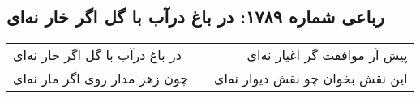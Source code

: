 \begin{center}
\section*{رباعی شماره ۱۷۸۹: در باغ درآب با گل اگر خار نه‌ای}
\label{sec:1789}
\begin{longtable}{l p{0.5cm} r}
در باغ درآب با گل اگر خار نه‌ای
&&
پیش آر موافقت گر اغیار نه‌ای
\\
چون زهر مدار روی اگر مار نه‌ای
&&
این نقش بخوان چو نقش دیوار نه‌ای
\\
\end{longtable}
\end{center}

